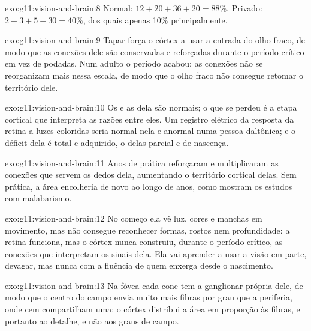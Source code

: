 \begin{solution}{exo:g11:vision-and-brain:8}
Normal: $12 + 20 + 36 + 20 = 88\%$. Privado: $2 + 3 + 5 + 30 = 40\%$,
dos quais apenas 10\% principalmente.
\end{solution}

\begin{solution}{exo:g11:vision-and-brain:9}
Tapar força o córtex a usar a entrada do olho fraco, de modo que as
conexões dele são conservadas e reforçadas durante o período crítico em
vez de podadas. Num adulto o período acabou: as conexões não se
reorganizam mais nessa escala, de modo que o olho fraco não consegue
retomar o território dele.
\end{solution}

\begin{solution}{exo:g11:vision-and-brain:10}
Os  e as  dela são normais; o que se perdeu é a etapa
cortical que interpreta as razões entre eles. Um registro elétrico da
resposta da retina a luzes coloridas seria normal nela e anormal numa
pessoa daltônica; e o déficit dela é total e adquirido, o delas parcial
e de nascença.
\end{solution}

\begin{solution}{exo:g11:vision-and-brain:11}
Anos de prática reforçaram e multiplicaram as conexões que servem os
dedos dela, aumentando o território cortical delas. Sem prática, a área
encolheria de novo ao longo de anos, como mostram os estudos com
malabarismo.
\end{solution}

\begin{solution}{exo:g11:vision-and-brain:12}
No começo ela vê luz, cores e manchas em movimento, mas não consegue
reconhecer formas, rostos nem profundidade: a retina funciona, mas o
córtex nunca construiu, durante o período crítico, as conexões que
interpretam os sinais dela. Ela vai aprender a usar a visão em parte,
devagar, mas nunca com a fluência de quem enxerga desde o nascimento.
\end{solution}

\begin{solution}{exo:g11:vision-and-brain:13}
Na fóvea cada cone tem a  ganglionar própria dele, de modo que o
centro do campo envia muito mais fibras por grau que a periferia, onde
cem  compartilham uma; o córtex distribui a área em proporção
às fibras, e portanto ao detalhe, e não aos graus de campo.
\end{solution}

